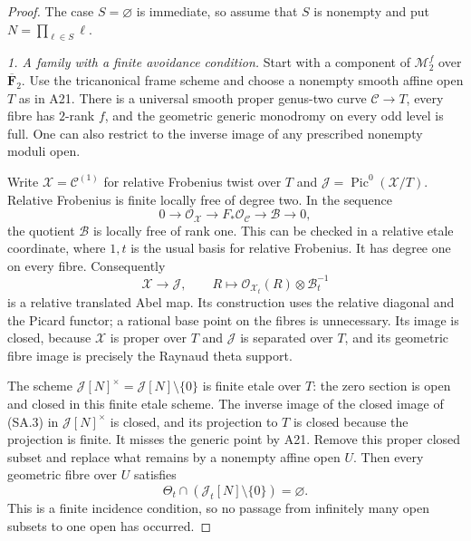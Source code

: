\begin{proof}
The case $S=\varnothing$ is immediate, so assume that $S$
is nonempty and put $N=\prod_{\ell\in S}\ell$.

\emph{1. A family with a finite avoidance condition.}
Start with a component of $\mathcal M_2^f$ over
$\overline{\mathbf F}_2$.  Use the tricanonical frame scheme
and choose a nonempty smooth affine open $T$ as in A21.
There is a universal smooth proper genus-two curve
$\mathcal C\to T$, every fibre has $2$-rank $f$, and the
geometric generic monodromy on every odd level is full.
One can also restrict to the inverse image of any
prescribed nonempty moduli open.

Write $\mathcal X=\mathcal C^{(1)}$ for relative Frobenius
twist over $T$ and
$\mathcal J=\operatorname{Pic}^0(\mathcal X/T)$.
Relative Frobenius is finite locally free of degree two.
In the sequence
\[
 0\longrightarrow\mathcal O_{\mathcal X}
  \longrightarrow F_*\mathcal O_{\mathcal C}
  \longrightarrow\mathcal B\longrightarrow0,                 \tag{SA.2}
\]
the quotient $\mathcal B$ is locally free of rank one.
This can be checked in a relative etale coordinate, where
$1,t$ is the usual basis for relative Frobenius.
It has degree one on every fibre.  Consequently
\[
 \mathcal X\longrightarrow\mathcal J,\qquad
 R\longmapsto\mathcal O_{\mathcal X_t}(R)
                         \otimes\mathcal B_t^{-1}             \tag{SA.3}
\]
is a relative translated Abel map.  Its construction uses
the relative diagonal and the Picard functor; a rational
base point on the fibres is unnecessary.  Its image is
closed, because $\mathcal X$ is proper over $T$ and
$\mathcal J$ is separated over $T$, and its geometric
fibre image is precisely the Raynaud theta support.

The scheme
$\mathcal J[N]^\times=\mathcal J[N]\setminus\{0\}$
is finite etale over $T$: the zero section is open and
closed in this finite etale scheme.  The inverse image
of the closed image of (SA.3) in
$\mathcal J[N]^\times$ is closed, and its projection to
$T$ is closed because the projection is finite.
It misses the generic point by A21.  Remove this proper
closed subset and replace what remains by a nonempty
affine open $U$.  Then every geometric fibre over $U$
satisfies
\[
                  \Theta_t\cap
                  (\mathcal J_t[N]\setminus\{0\})
                           =\varnothing.                     \tag{SA.4}
\]
This is a finite incidence condition, so no passage from
infinitely many open subsets to one open has occurred.


\end{proof}
